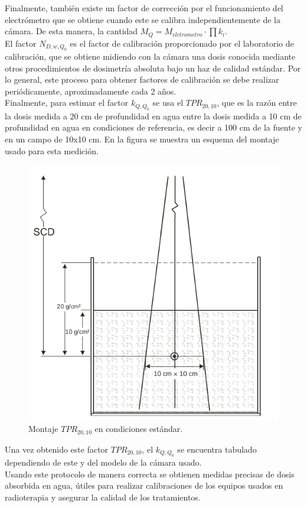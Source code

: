 Finalmente, también existe un factor de corrección por el funcionamiento del electrómetro que se obtiene cuando este se calibra independientemente de la cámara. De esta manera, la cantidad $M_Q=M_{elctrometro}\cdot \prod k_i$.\\

El factor $N_{D,w,Q_{0}}$ es el factor de calibración proporcionado por el laboratorio de calibración, que se obtiene midiendo con la cámara una dosis conocida mediante otros procedimientos de dosimetría absoluta bajo un haz de calidad estándar. Por lo general, este proceso para obtener factores de calibración se debe realizar periódicamente, aproximadamente cada 2 años.\\

Finalmente, para estimar el factor $k_{Q,Q_{0}}$ se usa el $TPR_{20,10}$, que es la razón entre la dosis medida a 20 cm de profundidad en agua entre la dosis medida a 10 cm de profundidad en agua en condiciones de referencia, es decir a 100 cm de la fuente y en un campo de 10x10 cm. En la figura se muestra un esquema del montaje usado para esta medición.\\
 \begin{figure}[H]
 	\centering
 	\includegraphics[width=0.7\linewidth]{images/TPR2010.png}
 	\caption{Montaje $TPR_{20,10} $ en condiciones estándar\cite{TPR398}.}
 	\label{fig:TPR2010}
 \end{figure}
Una vez obtenido este factor $TPR_{20,10}$, el $k_{Q,Q_{0}}$ se encuentra tabulado dependiendo de este y del modelo de la cámara usado\cite{TPR398}.\\

Usando este protocolo de manera correcta se obtienen medidas precisas de dosis absorbida en agua, útiles para realizar calibraciones de los equipos usados en radioterapia y asegurar la calidad de los tratamientos.\\


